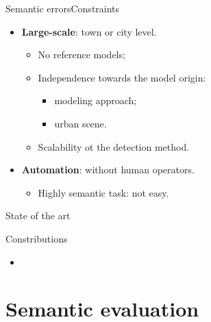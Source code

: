 \documentclass[10pt]{beamer}
\begin{document}
            \begin{frame}{Semantic errors}{Constraints}
                \begin{itemize}[label=$\blacktriangleright$, font=\color{IGNGreen}]
                    \item<1-> \textbf{Large-scale}: town or city level.
                        \begin{itemize}
                            \item<2-6> No reference models;
                            \item<3-6> Independence towards the model origin:
                            \begin{itemize}
                                \item<4-6> modeling approach;
                                \item<5-6> urban scene.
                            \end{itemize}
                            \item<6> Scalability ot the detection method.
                        \end{itemize}
                    \item<7-8> \textbf{Automation}: without human operators.
                        \begin{itemize}
                            \item<8> Highly semantic task: not easy.
                        \end{itemize}
                \end{itemize}
            \end{frame}

        \begin{frame}{State of the art}
            \centering
            
        \end{frame}

        \begin{frame}{Constributions}
            \begin{itemize}[label=$\blacktriangleright$, font=\color{IGNGreen}, itemsep=2em]
                \item<1-> 
            \end{itemize}
        \end{frame}

    \section{Semantic evaluation}
\end{document}
